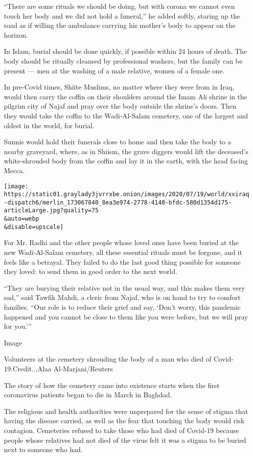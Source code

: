 ``There are some rituals we should be doing, but with corona we cannot
even touch her body and we did not hold a funeral,'' he added softly,
staring up the road as if willing the ambulance carrying his mother's
body to appear on the horizon.

In Islam, burial should be done quickly, if possible within 24 hours of
death. The body should be ritually cleansed by professional washers, but
the family can be present --- men at the washing of a male relative,
women of a female one.

In pre-Covid times, Shiite Muslims, no matter where they were from in
Iraq, would then carry the coffin on their shoulders around the Imam Ali
shrine in the pilgrim city of Najaf and pray over the body outside the
shrine's doors. Then they would take the coffin to the Wadi-Al-Salam
cemetery, one of the largest and oldest in the world, for burial.

Sunnis would hold their funerals close to home and then take the body to
a nearby graveyard, where, as in Shiism, the grave diggers would lift
the deceased's white-shrouded body from the coffin and lay it in the
earth, with the head facing Mecca.

\texttt{[image: https://static01.graylady3jvrrxbe.onion/images/2020/07/19/world/xxiraq-dispatch6/merlin\_173067840\_8ea3e974-2778-4140-bfdc-580d1354d175-articleLarge.jpg?quality=75\\\&auto=webp\\\&disable=upscale]}

For Mr. Radhi and the other people whose loved ones have been buried at
the new Wadi-Al-Salam cemetery, all these essential rituals must be
forgone, and it feels like a betrayal. They failed to do the last good
thing possible for someone they loved: to send them in good order to the
next world.

``They are burying their relative not in the usual way, and this makes
them very sad,'' said Tawfik Mahdi, a cleric from Najaf, who is on hand
to try to comfort families. ``Our role is to reduce their grief and say,
`Don't worry, this pandemic happened and you cannot be close to them
like you were before, but we will pray for you.'''

Image

Volunteers at the cemetery shrouding the body of a man who died of
Covid-19.Credit...Alaa Al-Marjani/Reuters

The story of how the cemetery came into existence starts when the first
coronavirus patients began to die in March in Baghdad.

The religious and health authorities were unprepared for the sense of
stigma that having the disease carried, as well as the fear that
touching the body would risk contagion. Cemeteries refused to take those
who had died of Covid-19 because people whose relatives had not died of
the virus felt it was a stigma to be buried next to someone who had.


